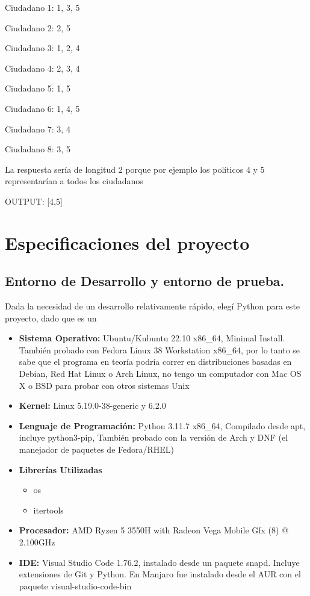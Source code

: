 \documentclass[a4paper]{article}
\begin{document}
Ciudadano 1: {1, 3, 5}

Ciudadano 2: {2, 5}

Ciudadano 3: {1, 2, 4}

Ciudadano 4: {2, 3, 4}

Ciudadano 5: {1, 5}

Ciudadano 6: {1, 4, 5}

Ciudadano 7: {3, 4}

Ciudadano 8: {3, 5}

La respuesta sería de longitud 2 porque por ejemplo los políticos 4 y 5 representarían a todos los ciudadanos

OUTPUT: [4,5]
\section{Especificaciones del proyecto}

\subsection{Entorno de Desarrollo y entorno de prueba.}

Dada la necesidad de un desarrollo relativamente rápido, elegí Python para este proyecto, dado que es un 


\begin{itemize}
    \item \textbf{Sistema Operativo: } Ubuntu/Kubuntu 22.10 x86\_64, Minimal Install. También probado con Fedora
    Linux 38 Workstation x86\_64, por lo tanto se sabe que el programa en teoría podría correr en distribuciones basadas en Debian,
    Red Hat Linux o Arch Linux, no tengo un computador con Mac OS X o BSD para probar con otros sistemas Unix
    \item \textbf{Kernel: }Linux 5.19.0-38-generic y 6.2.0
    \item \textbf{Lenguaje de Programación: }Python 3.11.7 x86\_64, Compilado desde apt, incluye python3-pip,
    También probado con la versión de Arch y DNF (el manejador de paquetes de Fedora/RHEL)
    \item \textbf{Librerías Utilizadas}
    \begin{itemize}
        \item os
        \item itertools
    \end{itemize}
    \item \textbf{Procesador: }AMD Ryzen 5 3550H with Radeon Vega Mobile Gfx (8) @ 2.100GHz 
    \item \textbf{IDE: } Visual Studio Code 1.76.2, instalado desde un paquete snapd. Incluye extensiones
    de Git y Python. En Manjaro fue instalado desde el AUR con el paquete visual-studio-code-bin
\end{itemize}
\end{document}
